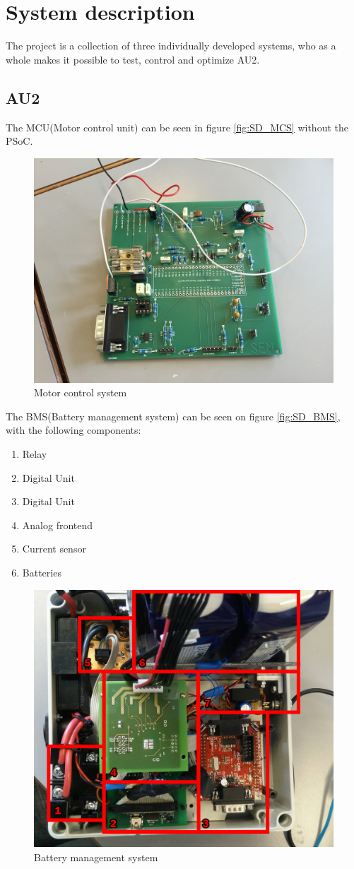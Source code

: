 \chapter{System description}
The project is a collection of three individually developed systems, who as a whole makes it possible to test, control and optimize AU2.

\section{AU2}
The MCU(Motor control unit) can be seen in figure \vref{fig:SD_MCS} without the PSoC.

\begin{figure}[H]
	\centering
	\includegraphics[width=0.6\linewidth]{SubPages/Images/SD_MCS}
	\caption{Motor control system}
	\label{fig:SD_MCS}
\end{figure}

The BMS(Battery management system) can be seen on figure \vref{fig:SD_BMS}, with the following components:

\begin{enumerate}
	\item Relay
	\item Digital Unit
	\item Digital Unit
	\item Analog frontend
	\item Current sensor
	\item Batteries
\end{enumerate}

\begin{figure}[H]
	\centering
	\includegraphics[width=0.7\linewidth]{SubPages/Images/SD_BMS}
	\caption{Battery management system}
	\label{fig:SD_BMS}
\end{figure}

